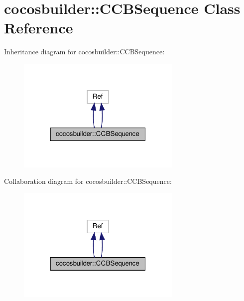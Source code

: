 \hypertarget{classcocosbuilder_1_1CCBSequence}{}\section{cocosbuilder\+:\+:C\+C\+B\+Sequence Class Reference}
\label{classcocosbuilder_1_1CCBSequence}


Inheritance diagram for cocosbuilder\+:\+:C\+C\+B\+Sequence\+:
\nopagebreak
\begin{figure}[H]
\begin{center}
\leavevmode
\includegraphics[width=223pt]{classcocosbuilder_1_1CCBSequence__inherit__graph}
\end{center}
\end{figure}


Collaboration diagram for cocosbuilder\+:\+:C\+C\+B\+Sequence\+:
\nopagebreak
\begin{figure}[H]
\begin{center}
\leavevmode
\includegraphics[width=223pt]{classcocosbuilder_1_1CCBSequence__coll__graph}
\end{center}
\end{figure}
